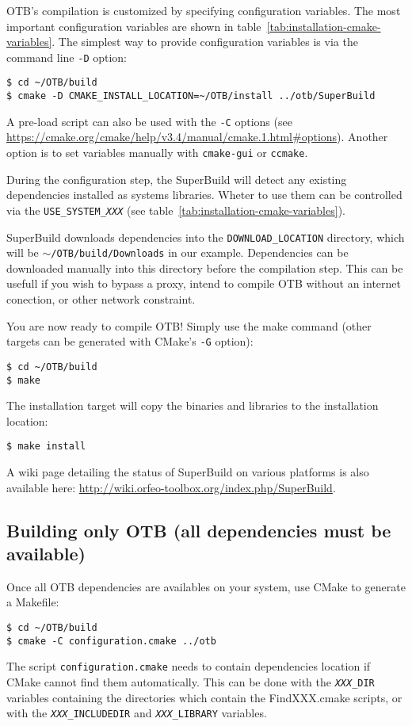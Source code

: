 OTB's compilation is customized by specifying configuration variables.
The most important configuration variables are shown in table~\ref{tab:installation-cmake-variables}.
The simplest way to provide configuration variables is via the command line \texttt{-D} option:
\begin{verbatim}
$ cd ~/OTB/build
$ cmake -D CMAKE_INSTALL_LOCATION=~/OTB/install ../otb/SuperBuild
\end{verbatim}
A pre-load script can also be used with the \texttt{-C} options (see
\url{https://cmake.org/cmake/help/v3.4/manual/cmake.1.html#options}).
Another option is to set variables manually with \texttt{cmake-gui} or \texttt{ccmake}.

During the configuration step, the SuperBuild will detect any existing dependencies installed as systems libraries.
Wheter to use them can be controlled via the \texttt{USE\_SYSTEM\_\textit{XXX}} (see
table~\ref{tab:installation-cmake-variables}).

SuperBuild downloads dependencies into the \texttt{DOWNLOAD\_LOCATION} directory, which will be
\texttt{$\sim$/OTB/build/Downloads} in our example.
Dependencies can be downloaded manually into this directory before the compilation step.
This can be usefull if you wish to bypass a proxy, intend to compile OTB without an internet conection, or other network
constraint.

You are now ready to compile OTB!
Simply use the make command (other targets can be generated with CMake's \texttt{-G} option):
\begin{verbatim}
$ cd ~/OTB/build
$ make
\end{verbatim}

The installation target will copy the binaries and libraries to the installation location:
\begin{verbatim}
$ make install
\end{verbatim}

A wiki page detailing the status of SuperBuild on various platforms is also available here:
\url{http://wiki.orfeo-toolbox.org/index.php/SuperBuild}.

\subsection{Building only OTB (all dependencies must be available)}
\label{sec:installation-linux-normalbuild}

Once all OTB dependencies are availables on your system, use CMake to generate a Makefile:
\begin{verbatim}
$ cd ~/OTB/build
$ cmake -C configuration.cmake ../otb
\end{verbatim}
The script \texttt{configuration.cmake} needs to contain dependencies location if CMake cannot find them automatically.
This can be done with the \texttt{\textit{XXX}\_DIR} variables containing the directories which contain the
FindXXX.cmake scripts, or with the \texttt{\textit{XXX}\_INCLUDEDIR} and \texttt{\textit{XXX}\_LIBRARY} variables.

